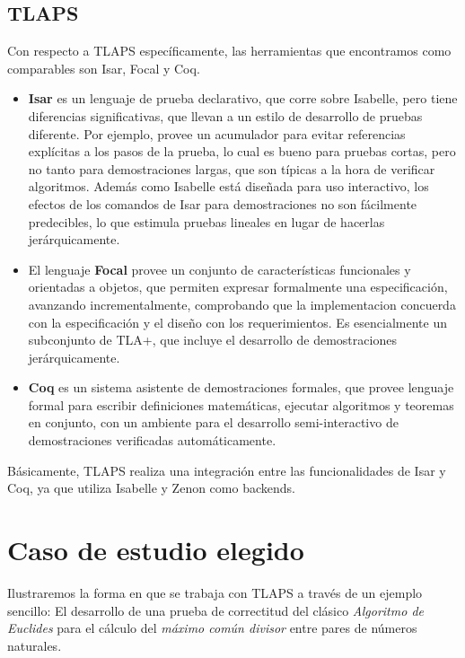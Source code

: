 \documentclass[spanish]{llncs}
\begin{document}
  \subsection{TLAPS}
  Con respecto a TLAPS específicamente, las herramientas que encontramos como comparables son Isar, Focal y Coq.
    \begin{itemize}
      \item 
      \textbf{Isar} es un lenguaje de prueba declarativo, que corre sobre Isabelle, pero tiene diferencias significativas, que llevan a un estilo de desarrollo de pruebas diferente. Por ejemplo, provee un acumulador para evitar referencias explícitas a los pasos de la prueba, lo cual es bueno para pruebas cortas, pero no tanto para demostraciones largas, que son típicas a la hora de verificar algoritmos. Además como Isabelle está diseñada para uso interactivo, los efectos de los comandos de Isar para demostraciones no son fácilmente 
      predecibles, lo que estimula pruebas lineales en lugar de hacerlas jerárquicamente. 

      \item
      El lenguaje \textbf{Focal} provee un conjunto de características funcionales y orientadas a objetos, que permiten expresar formalmente una especificación, avanzando incrementalmente, comprobando que la implementacion concuerda con la especificación y el diseño con los requerimientos. Es esencialmente un subconjunto de TLA+, que incluye el desarrollo 
      de demostraciones jerárquicamente.

      \item
      \textbf{Coq} es un sistema asistente de demostraciones formales, que provee lenguaje formal para escribir definiciones matemáticas, ejecutar algoritmos y teoremas en conjunto, con un ambiente para el desarrollo semi-interactivo de demostraciones verificadas automáticamente.

    \end{itemize}
  
  Básicamente, TLAPS realiza una integración entre las funcionalidades de  Isar y Coq, ya que utiliza Isabelle y Zenon como backends.

\section{Caso de estudio elegido}
Ilustraremos la forma en que se trabaja con TLAPS a través de un ejemplo sencillo: 
El desarrollo de una prueba de correctitud del clásico \textit{Algoritmo de Euclides} para el cálculo del \textit{máximo común divisor} entre pares de números naturales.
\end{document}
